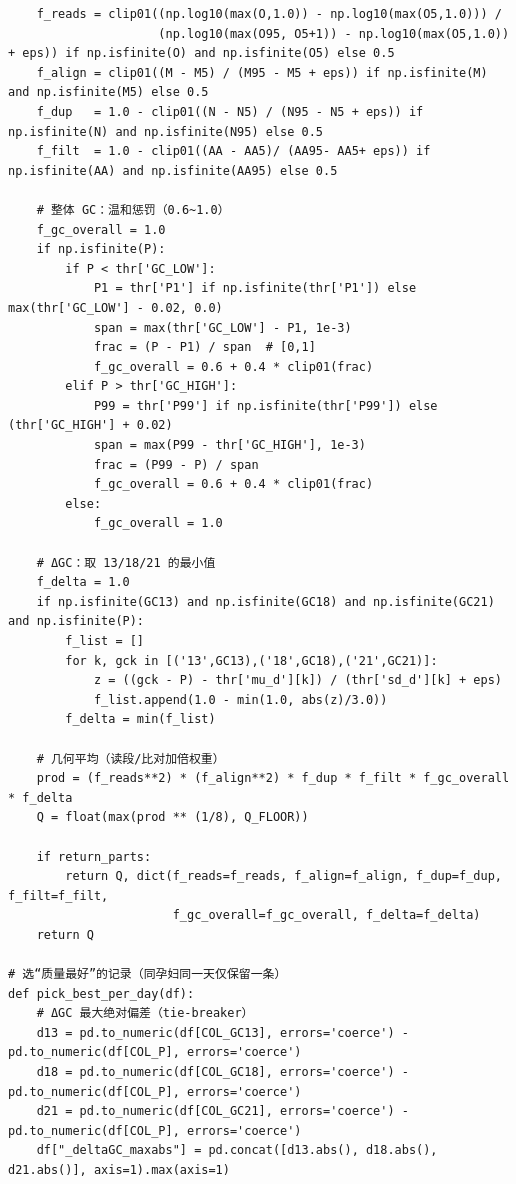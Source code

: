 \begin{lstlisting}
    f_reads = clip01((np.log10(max(O,1.0)) - np.log10(max(O5,1.0))) /
                     (np.log10(max(O95, O5+1)) - np.log10(max(O5,1.0)) + eps)) if np.isfinite(O) and np.isfinite(O5) else 0.5
    f_align = clip01((M - M5) / (M95 - M5 + eps)) if np.isfinite(M) and np.isfinite(M5) else 0.5
    f_dup   = 1.0 - clip01((N - N5) / (N95 - N5 + eps)) if np.isfinite(N) and np.isfinite(N95) else 0.5
    f_filt  = 1.0 - clip01((AA - AA5)/ (AA95- AA5+ eps)) if np.isfinite(AA) and np.isfinite(AA95) else 0.5

    # 整体 GC：温和惩罚（0.6~1.0）
    f_gc_overall = 1.0
    if np.isfinite(P):
        if P < thr['GC_LOW']:
            P1 = thr['P1'] if np.isfinite(thr['P1']) else max(thr['GC_LOW'] - 0.02, 0.0)
            span = max(thr['GC_LOW'] - P1, 1e-3)
            frac = (P - P1) / span  # [0,1]
            f_gc_overall = 0.6 + 0.4 * clip01(frac)
        elif P > thr['GC_HIGH']:
            P99 = thr['P99'] if np.isfinite(thr['P99']) else (thr['GC_HIGH'] + 0.02)
            span = max(P99 - thr['GC_HIGH'], 1e-3)
            frac = (P99 - P) / span
            f_gc_overall = 0.6 + 0.4 * clip01(frac)
        else:
            f_gc_overall = 1.0

    # ΔGC：取 13/18/21 的最小值
    f_delta = 1.0
    if np.isfinite(GC13) and np.isfinite(GC18) and np.isfinite(GC21) and np.isfinite(P):
        f_list = []
        for k, gck in [('13',GC13),('18',GC18),('21',GC21)]:
            z = ((gck - P) - thr['mu_d'][k]) / (thr['sd_d'][k] + eps)
            f_list.append(1.0 - min(1.0, abs(z)/3.0))
        f_delta = min(f_list)

    # 几何平均（读段/比对加倍权重）
    prod = (f_reads**2) * (f_align**2) * f_dup * f_filt * f_gc_overall * f_delta
    Q = float(max(prod ** (1/8), Q_FLOOR))

    if return_parts:
        return Q, dict(f_reads=f_reads, f_align=f_align, f_dup=f_dup, f_filt=f_filt,
                       f_gc_overall=f_gc_overall, f_delta=f_delta)
    return Q

# 选“质量最好”的记录（同孕妇同一天仅保留一条）
def pick_best_per_day(df):
    # ΔGC 最大绝对偏差（tie-breaker）
    d13 = pd.to_numeric(df[COL_GC13], errors='coerce') - pd.to_numeric(df[COL_P], errors='coerce')
    d18 = pd.to_numeric(df[COL_GC18], errors='coerce') - pd.to_numeric(df[COL_P], errors='coerce')
    d21 = pd.to_numeric(df[COL_GC21], errors='coerce') - pd.to_numeric(df[COL_P], errors='coerce')
    df["_deltaGC_maxabs"] = pd.concat([d13.abs(), d18.abs(), d21.abs()], axis=1).max(axis=1)

\end{lstlisting}